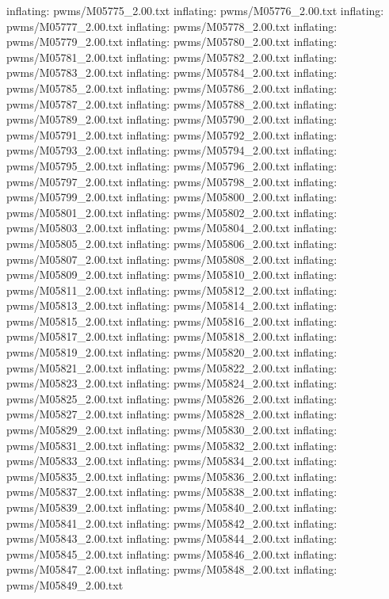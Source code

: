 \documentclass[letterpaper,10pt,english]{sphinxmanual}
\begin{document}
{\begin{sphinxVerbatim}[commandchars=\\\{\}]
  inflating: pwms/M05775\_2.00.txt
  inflating: pwms/M05776\_2.00.txt
  inflating: pwms/M05777\_2.00.txt
  inflating: pwms/M05778\_2.00.txt
  inflating: pwms/M05779\_2.00.txt
  inflating: pwms/M05780\_2.00.txt
  inflating: pwms/M05781\_2.00.txt
  inflating: pwms/M05782\_2.00.txt
  inflating: pwms/M05783\_2.00.txt
  inflating: pwms/M05784\_2.00.txt
  inflating: pwms/M05785\_2.00.txt
  inflating: pwms/M05786\_2.00.txt
  inflating: pwms/M05787\_2.00.txt
  inflating: pwms/M05788\_2.00.txt
  inflating: pwms/M05789\_2.00.txt
  inflating: pwms/M05790\_2.00.txt
  inflating: pwms/M05791\_2.00.txt
  inflating: pwms/M05792\_2.00.txt
  inflating: pwms/M05793\_2.00.txt
  inflating: pwms/M05794\_2.00.txt
  inflating: pwms/M05795\_2.00.txt
  inflating: pwms/M05796\_2.00.txt
  inflating: pwms/M05797\_2.00.txt
  inflating: pwms/M05798\_2.00.txt
  inflating: pwms/M05799\_2.00.txt
  inflating: pwms/M05800\_2.00.txt
  inflating: pwms/M05801\_2.00.txt
  inflating: pwms/M05802\_2.00.txt
  inflating: pwms/M05803\_2.00.txt
  inflating: pwms/M05804\_2.00.txt
  inflating: pwms/M05805\_2.00.txt
  inflating: pwms/M05806\_2.00.txt
  inflating: pwms/M05807\_2.00.txt
  inflating: pwms/M05808\_2.00.txt
  inflating: pwms/M05809\_2.00.txt
  inflating: pwms/M05810\_2.00.txt
  inflating: pwms/M05811\_2.00.txt
  inflating: pwms/M05812\_2.00.txt
  inflating: pwms/M05813\_2.00.txt
  inflating: pwms/M05814\_2.00.txt
  inflating: pwms/M05815\_2.00.txt
  inflating: pwms/M05816\_2.00.txt
  inflating: pwms/M05817\_2.00.txt
  inflating: pwms/M05818\_2.00.txt
  inflating: pwms/M05819\_2.00.txt
  inflating: pwms/M05820\_2.00.txt
  inflating: pwms/M05821\_2.00.txt
  inflating: pwms/M05822\_2.00.txt
  inflating: pwms/M05823\_2.00.txt
  inflating: pwms/M05824\_2.00.txt
  inflating: pwms/M05825\_2.00.txt
  inflating: pwms/M05826\_2.00.txt
  inflating: pwms/M05827\_2.00.txt
  inflating: pwms/M05828\_2.00.txt
  inflating: pwms/M05829\_2.00.txt
  inflating: pwms/M05830\_2.00.txt
  inflating: pwms/M05831\_2.00.txt
  inflating: pwms/M05832\_2.00.txt
  inflating: pwms/M05833\_2.00.txt
  inflating: pwms/M05834\_2.00.txt
  inflating: pwms/M05835\_2.00.txt
  inflating: pwms/M05836\_2.00.txt
  inflating: pwms/M05837\_2.00.txt
  inflating: pwms/M05838\_2.00.txt
  inflating: pwms/M05839\_2.00.txt
  inflating: pwms/M05840\_2.00.txt
  inflating: pwms/M05841\_2.00.txt
  inflating: pwms/M05842\_2.00.txt
  inflating: pwms/M05843\_2.00.txt
  inflating: pwms/M05844\_2.00.txt
  inflating: pwms/M05845\_2.00.txt
  inflating: pwms/M05846\_2.00.txt
  inflating: pwms/M05847\_2.00.txt
  inflating: pwms/M05848\_2.00.txt
  inflating: pwms/M05849\_2.00.txt

\end{sphinxVerbatim}}
\end{document}
